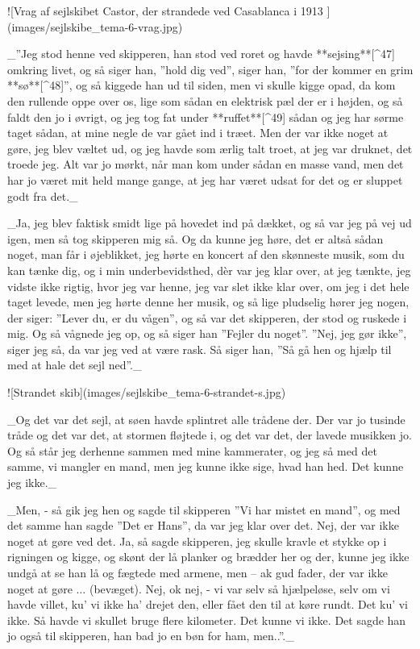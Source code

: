 \documentclass{book}
\begin{document}
![Vrag af sejlskibet Castor, der strandede ved Casablanca i 1913
](images/sejlskibe_tema-6-vrag.jpg)

 _”Jeg stod henne ved
skipperen, han stod ved roret og havde **sejsing**[^47] omkring livet, og så siger han, ”hold dig
ved”, siger han, ”for der kommer en grim **sø**[^48]”, og så kiggede han ud til siden, men vi
skulle kigge opad, da kom den rullende oppe over os, lige som sådan en elektrisk pæl der
er i højden, og så faldt den jo i øvrigt, og jeg tog fat under **ruffet**[^49] sådan og jeg har
sørme taget sådan, at mine negle de var gået ind i træet. Men der var ikke noget at gøre,
jeg blev væltet ud, og jeg havde som ærlig talt troet, at jeg var druknet, det troede jeg.
Alt var jo mørkt, når man kom under sådan en masse vand, men det har jo været mit held
mange gange, at jeg har været udsat for det og er sluppet godt fra det._

 _Ja, jeg blev faktisk smidt lige på hovedet ind på dækket, og så var jeg på vej ud igen,
men så tog skipperen mig så. Og da kunne jeg høre, det er altså sådan noget, man får i
øjeblikket, jeg hørte en koncert af den skønneste musik, som du kan tænke dig, og i min
underbevidsthed, dèr var jeg klar over, at jeg tænkte, jeg vidste ikke rigtig, hvor jeg
var henne, jeg var slet ikke klar over, om jeg i det hele taget levede, men jeg hørte
denne her musik, og så lige pludselig hører jeg nogen, der siger: ”Lever du, er du vågen”,
og så var det skipperen, der stod og ruskede i mig. Og så vågnede jeg op, og så siger han
”Fejler du noget”. ”Nej, jeg gør ikke”, siger jeg så, da var jeg ved at være rask. Så
siger han, ”Så gå hen og hjælp til med at hale det sejl ned”._

![Strandet skib](images/sejlskibe_tema-6-strandet-s.jpg)

 _Og det var det sejl, at søen havde splintret alle trådene der. Der var jo
tusinde tråde og det var det, at stormen fløjtede i, og det var det, der lavede musikken
jo. Og så står jeg derhenne sammen med mine kammerater, og jeg så med det samme, vi
mangler en mand, men jeg kunne ikke sige, hvad han hed. Det kunne jeg ikke._

 _Men, - så gik jeg hen og sagde til skipperen ”Vi har mistet en mand”, og med det samme han
sagde ”Det er Hans”, da var jeg klar over det. Nej, der var ikke noget at gøre ved det.
Ja, så sagde skipperen, jeg skulle kravle et stykke op i rigningen og kigge, og skønt der
lå planker og brædder her og der, kunne jeg ikke undgå at se han lå og fægtede med armene,
men – ak gud fader, der var ikke noget at gøre $\ldots$ (bevæget). Nej, ok nej, - vi var selv så
hjælpeløse, selv om vi havde villet, ku' vi ikke ha' drejet den, eller fået den til at
køre rundt. Det ku' vi ikke. Så havde vi skullet bruge flere kilometer. Det kunne vi ikke.
Det sagde han jo også til skipperen, han bad jo en bøn for ham, men..”._
\end{document}
